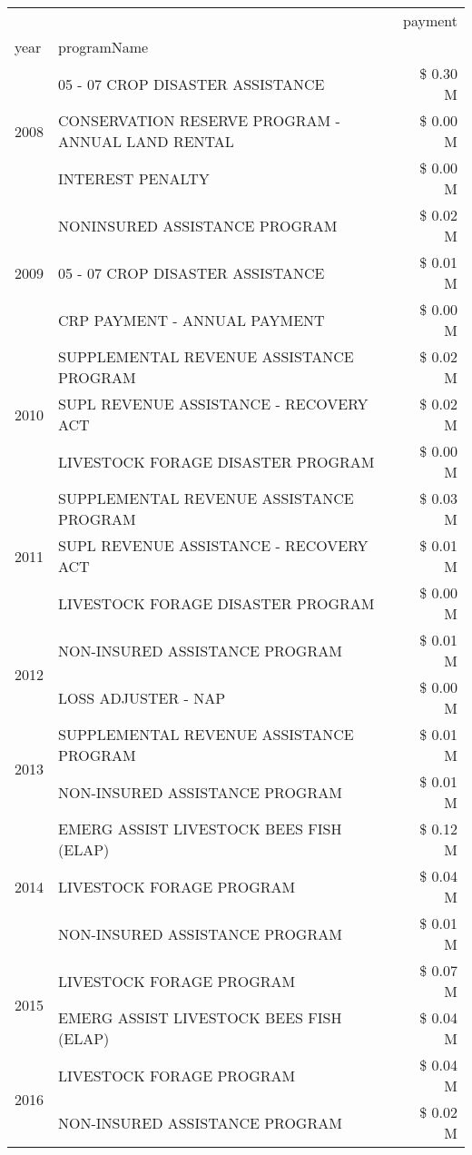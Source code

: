 \begin{tabular}{llr}
\toprule
 &  & payment \\
year & programName &  \\
\midrule
\multirow[t]{3}{*}{2008} & 05 - 07 CROP DISASTER ASSISTANCE & \$ 0.30 M \\
 & CONSERVATION RESERVE PROGRAM - ANNUAL LAND RENTAL & \$ 0.00 M \\
 & INTEREST PENALTY & \$ 0.00 M \\
\cline{1-3}
\multirow[t]{3}{*}{2009} & NONINSURED ASSISTANCE PROGRAM & \$ 0.02 M \\
 & 05 - 07 CROP DISASTER ASSISTANCE & \$ 0.01 M \\
 & CRP PAYMENT - ANNUAL PAYMENT & \$ 0.00 M \\
\cline{1-3}
\multirow[t]{3}{*}{2010} & SUPPLEMENTAL REVENUE ASSISTANCE PROGRAM & \$ 0.02 M \\
 & SUPL REVENUE ASSISTANCE - RECOVERY ACT & \$ 0.02 M \\
 & LIVESTOCK FORAGE DISASTER PROGRAM & \$ 0.00 M \\
\cline{1-3}
\multirow[t]{3}{*}{2011} & SUPPLEMENTAL REVENUE ASSISTANCE PROGRAM & \$ 0.03 M \\
 & SUPL REVENUE ASSISTANCE - RECOVERY ACT & \$ 0.01 M \\
 & LIVESTOCK FORAGE DISASTER PROGRAM & \$ 0.00 M \\
\cline{1-3}
\multirow[t]{2}{*}{2012} & NON-INSURED ASSISTANCE PROGRAM & \$ 0.01 M \\
 & LOSS ADJUSTER - NAP & \$ 0.00 M \\
\cline{1-3}
\multirow[t]{2}{*}{2013} & SUPPLEMENTAL REVENUE ASSISTANCE PROGRAM & \$ 0.01 M \\
 & NON-INSURED ASSISTANCE PROGRAM & \$ 0.01 M \\
\cline{1-3}
\multirow[t]{3}{*}{2014} & EMERG ASSIST LIVESTOCK BEES FISH (ELAP) & \$ 0.12 M \\
 & LIVESTOCK FORAGE PROGRAM & \$ 0.04 M \\
 & NON-INSURED ASSISTANCE PROGRAM & \$ 0.01 M \\
\cline{1-3}
\multirow[t]{2}{*}{2015} & LIVESTOCK FORAGE PROGRAM & \$ 0.07 M \\
 & EMERG ASSIST LIVESTOCK BEES FISH (ELAP) & \$ 0.04 M \\
\cline{1-3}
\multirow[t]{3}{*}{2016} & LIVESTOCK FORAGE PROGRAM & \$ 0.04 M \\
 & NON-INSURED ASSISTANCE PROGRAM & \$ 0.02 M \\

\end{tabular}
